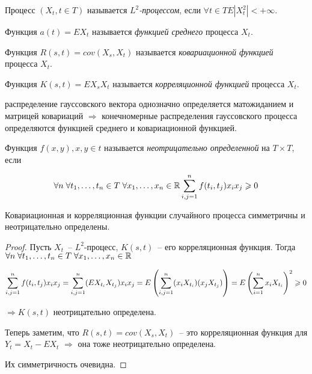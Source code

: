 \begin{definition}
Процесс $(X_t, t \in T)$ называется \emph{$L^2$-процессом}, если $\forall t \in T E|X_t^2| < +\infty$.

Функция $a(t) = EX_t$ называется \emph{функцией среднего} процесса $X_t$.

Функция $R(s,t) = cov(X_s, X_t)$ называется \emph{ковариационной функцией} процесса $X_t$.

Функция $K(s,t) = EX_sX_t$ называется \emph{корреляционной функцией} процесса $X_t$.
\end{definition}

\begin{remark}
распределение гауссовского вектора однозначно определяется матожиданием и матрицей ковариаций
$\Rightarrow$ конечномерные распределения гауссовского процесса определяются функцией среднего
и ковариационной функцией.
\end{remark}

\begin{definition}
Функция $f(x, y), x, y \in t$ называется \emph{неотрицательно определенной} на $T\times T$, если

$$\forall n \; \forall t_{1}, \dots, t_{n} \in T \; \forall x_{1}, \dots, x_{n} \in \mathbb{R}
\sum_{i, j = 1}^{n} f(t_i, t_j) x_i x_j \geqslant 0$$
\end{definition}

\begin{lem}
Ковариационная и корреляционная функции случайного процесса симметричны и неотрицательно
определены.
\end{lem}
\begin{proof}
Пусть $X_t$~-- $L^2$-процесс, $K(s, t)$~-- его корреляционная функция. Тогда
$\forall n \; \forall t_{1}, \dots, t_{n} \in T \; \forall x_{1}, \dots, x_{n} \in \mathbb{R}$

$$\sum_{i, j = 1}^{n} f(t_i, t_j) x_i x_j = \sum_{i,j=1}^n(EX_{t_i}X_{t_j})x_i x_j =
E \left( \sum_{i,j=1}^n (x_iX_{t_i}) (x_j X_{t_j}) \right) =
E\left( \sum_{i=1}^n x_i X_{t_i} \right)^2 \geqslant 0$$

$\Rightarrow K(s,t)$ неотрицательно определена.

Теперь заметим, что  $R(s,t) = cov(X_s, X_t)$~-- это корреляционная функция для  $Y_t = X_t - EX_t$
$\Rightarrow$ она тоже неотрицательно определена.

Их симметричность очевидна.
\end{proof}

